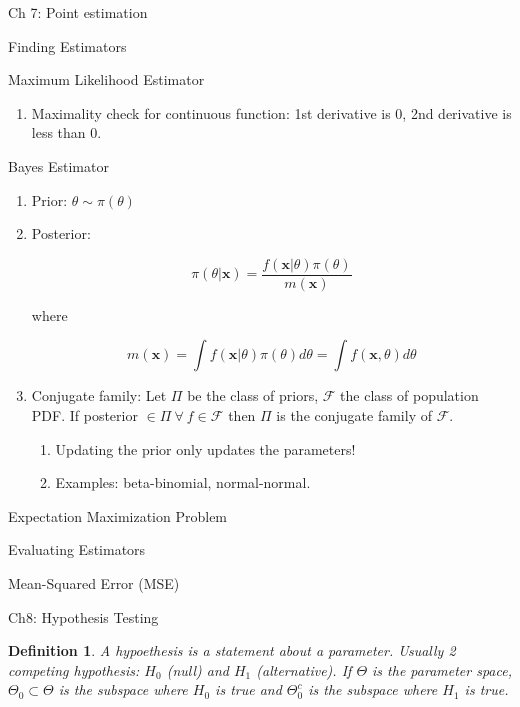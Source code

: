 \documentclass{article}
\newcommand{\bo}[1]{\boldsymbol{#1}}
\newtheorem{definition}{Definition}
\begin{document}
\begin{section}{Ch 7: Point estimation}
\begin{subsection}{Finding Estimators}
\begin{subsubsection}{Maximum Likelihood Estimator}
\begin{enumerate}
\item Maximality check for continuous function: 1st derivative is 0, 2nd
derivative is less than 0.
\end{enumerate}
\end{subsubsection}

\begin{subsubsection}{Bayes Estimator}
\begin{enumerate}
\item Prior: $\theta \sim \pi(\theta)$
\item Posterior: 

\[ \pi(\theta | \bo{x}) = \frac{f(\bo{x}|\theta) \pi(\theta)}{m(\bo{x})} \]

\noindent where

\[ m(\bo{x}) = \int f(\bo{x}|\theta) \pi(\theta) d\theta = 
               \int f(\bo{x}, \theta) d\theta \]

\item Conjugate family: Let $\Pi$ be the class of priors, $\mathcal{F}$ the
class of population PDF. If posterior $\in \Pi \ \forall \  f \in \mathcal{F}$ 
then $\Pi$ is the conjugate family of $\mathcal{F}$.
  \begin{enumerate}
  \item Updating the prior only updates the parameters!
  \item Examples: beta-binomial, normal-normal.
  \end{enumerate}
\end{enumerate}
\end{subsubsection}

\begin{subsubsection}{Expectation Maximization Problem}
\end{subsubsection}
\end{subsection}

\begin{subsection}{Evaluating Estimators}
\begin{subsubsection}{Mean-Squared Error (MSE)}

\end{subsubsection}
\end{subsection}
\end{section}

\begin{section}{Ch8: Hypothesis Testing}
\begin{definition}
A hypoethesis is a statement about a parameter. Usually 2 competing hypothesis:
$H_{0}$ (null) and $H_{1}$ (alternative). If $\Theta$ is the parameter
space, $\Theta_{0} \subset \Theta$ is the subspace where $H_{0}$ is true
and $\Theta_{0}^{c}$ is the subspace where $H_{1}$ is true.
\end{definition}
\end{section}
\end{document}
